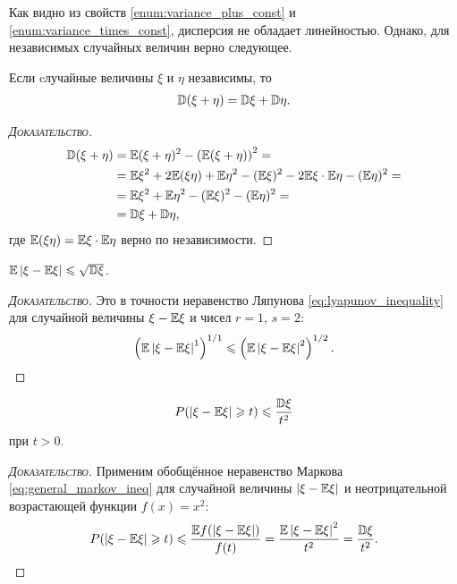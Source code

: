 \documentclass[../main.tex]{subfiles}
\begin{document}
Как видно из свойств \ref{enum:variance_plus_const} и \ref{enum:variance_times_const}, дисперсия не обладает линейностью. Однако, для независимых случайных величин верно следующее.

\begin{prop}
 Если cлучайные величины $ \xi  $ и $ \eta $ независимы, то
 \begin{align*}
  \mathbb D(\xi + \eta) = \mathbb D\xi + \mathbb D\eta.
 \end{align*}
\end{prop}
\begin{proof}[\normalfont\textsc{Доказательство}]
 \begin{align*}
  \mathbb D(\xi + \eta) &= \mathbb E(\xi + \eta)^{2} - \left( \mathbb E(\xi+\eta) \right)^{2} = \\
  &= \mathbb E\xi^{2} + 2\mathbb E(\xi\eta) + \mathbb E\eta^{2} -  (\mathbb E\xi)^{2} - 2\mathbb E\xi \cdot \mathbb E\eta - (\mathbb E\eta)^{2} = \\
  &=  \mathbb E\xi^{2} + \mathbb E\eta^{2} -  (\mathbb E\xi)^{2} - (\mathbb E\eta)^{2} = \\
  &=\mathbb D\xi+\mathbb D\eta,
 \end{align*} где $ \mathbb E(\xi\eta) = \mathbb E\xi \cdot \mathbb E\eta $ верно по независимости.
\end{proof}

\begin{prop}
 $ \mathbb E \left| \xi - \mathbb E\xi \right| \leqslant \sqrt{\mathbb D\xi} $.
\end{prop}
\begin{proof}[\normalfont\textsc{Доказательство}]
 Это в точности неравенство Ляпунова \eqref{eq:lyapunov_inequality} для случайной величины $ \xi - \mathbb E\xi $ и чисел $ r=1 $, $ s=2 $:
 \begin{align*}
  \left(\mathbb E \left| \xi-\mathbb E\xi \right|^{1} \right)^{1 / 1} \leqslant \left( \mathbb E \left| \xi-\mathbb E\xi \right|^{2} \right)^{1 / 2}.
 \end{align*}
\end{proof}

\begin{prop}
 \label{proposition:chebyshev_inequality}
 \begin{align}
  \label{equation:chebyshev_inequality}
  P(\left| \xi - \mathbb E\xi \right| \geqslant t) \leqslant \frac{\mathbb D\xi}{t^{2}}
 \end{align} при $ t > 0 $.
\end{prop}
\begin{proof}[\normalfont\textsc{Доказательство}]
 Применим обобщённое неравенство Маркова \eqref{eq:general_markov_ineq} для случайной величины $ \left| \xi-\mathbb E\xi \right| $ и неотрицательной возрастающей функции $ f(x) = x^{2} $:
 \begin{align*}
  P(\left| \xi-\mathbb E\xi \right| \geqslant t) \leqslant \frac{\mathbb E f(\left| \xi-\mathbb E\xi \right|)}{f(t)} = \frac{\mathbb E \left| \xi-\mathbb E\xi \right|^{2}}{t^{2}} = \frac{\mathbb D\xi}{t^{2}}.
 \end{align*}
\end{proof}
\end{document}
